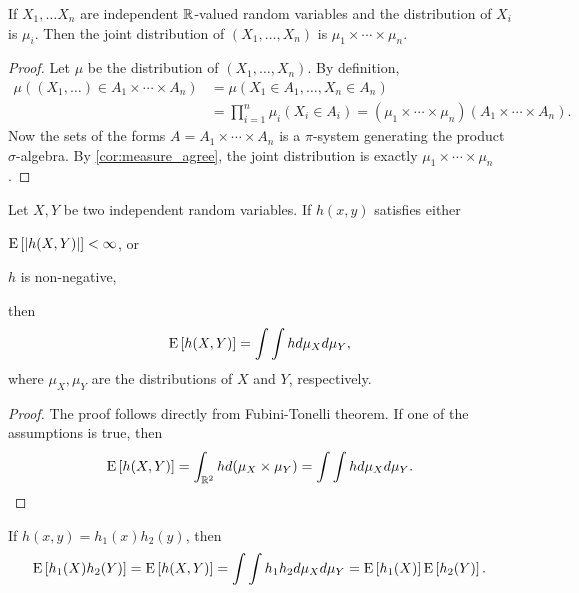 \begin{theorem}
    If $X_1,\ldots X_n$ are independent $\mathbb{R}$-valued random variables 
    and the distribution of $X_i$ is $\mu_i$. Then the joint distribution 
    of $(X_1,\ldots,X_n)$ is $\mu_1\times\cdots\times\mu_n$. 
\end{theorem}
\begin{proof}
    Let $\mu$ be the distribution of $(X_1,\ldots,X_n)$. By definition, 
    \begin{equation*}
        \begin{split}
            \mu((X_1,\ldots)\in A_1\times\cdots\times A_n)
            &= \mu(X_1\in A_1,\ldots, X_n\in A_n) \\
            &= \prod_{i=1}^n \mu_i(X_i\in A_i) 
            = (\mu_1\times\cdots\times\mu_n)(A_1\times\cdots\times A_n).
        \end{split} 
    \end{equation*}
    Now the sets of the forms $A = A_1\times\cdots\times A_n$ is a $\pi$-system 
    generating the product $\sigma$-algebra. By \cref{cor:measure_agree}, 
    the joint distribution is exactly $\mu_1\times\cdots\times\mu_n$. 
\end{proof}

\begin{theorem}\label{thm:mean_independence}
    Let $X,Y$ be two independent random variables. If 
    $h(x,y)$ satisfies either 
    \begin{thmenum}
        \item $\operatorname{E}\left[ {\left\lvert {h(X, Y)} \right\rvert} \right]<\infty$, or 
        \item $h$ is non-negative, 
    \end{thmenum}
    then 
    \begin{equation*}
        \operatorname{E}\left[ {h(X,Y)} \right] = \int\int hd\mu_Xd\mu_Y,
    \end{equation*}
    where $\mu_X,\mu_Y$ are the distributions of $X$ and $Y$, 
    respectively.
\end{theorem}
\begin{proof}
    The proof follows directly from Fubini-Tonelli theorem. If 
    one of the assumptions is true, then 
    \begin{equation*}
        \operatorname{E}\left[ {h(X,Y)} \right] = \int_{\mathbb{R}^2}hd(\mu_X\times\mu_Y) 
        = \int\int hd\mu_Xd\mu_Y. 
    \end{equation*}
\end{proof}
\begin{remark}
    If $h(x,y) = h_1(x)h_2(y)$, then 
    \begin{equation*}
        \operatorname{E}\left[ {h_1(X)h_2(Y)} \right] = \operatorname{E}\left[ {h(X,Y)} \right] 
        = \int\int h_1h_2d\mu_Xd\mu_Y 
        = \operatorname{E}\left[ {h_1(X)} \right]\operatorname{E}\left[ {h_2(Y)} \right]. 
    \end{equation*}
\end{remark}

